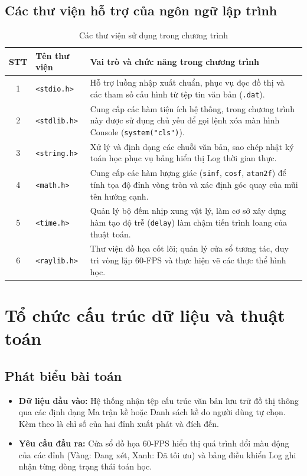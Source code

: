 \documentclass[12pt,a4paper,oneside]{report}
\begin{document}
\section{Các thư viện hỗ trợ của ngôn ngữ lập trình}
\begin{table}[H]
\centering
\caption{Các thư viện sử dụng trong chương trình}
\vspace{0.5em}
\begin{tabular}{|c|l|p{9cm}|}
\hline
\textbf{STT} & \textbf{Tên thư viện} & \textbf{Vai trò và chức năng trong chương trình} \\ \hline
1 & \texttt{<stdio.h>} & Hỗ trợ luồng nhập xuất chuẩn, phục vụ đọc đồ thị và các tham số cấu hình từ tệp tin văn bản (\texttt{.dat}). \\ \hline
2 & \texttt{<stdlib.h>} & Cung cấp các hàm tiện ích hệ thống, trong chương trình này được sử dụng chủ yếu để gọi lệnh xóa màn hình Console (\texttt{system("cls")}). \\ \hline
3 & \texttt{<string.h>} & Xử lý và định dạng các chuỗi văn bản, sao chép nhật ký toán học phục vụ bảng hiển thị Log thời gian thực. \\ \hline
4 & \texttt{<math.h>} & Cung cấp các hàm lượng giác (\texttt{sinf}, \texttt{cosf}, \texttt{atan2f}) để tính tọa độ đỉnh vòng tròn và xác định góc quay của mũi tên hướng cạnh. \\ \hline
5 & \texttt{<time.h>} & Quản lý bộ đếm nhịp xung vật lý, làm cơ sở xây dựng hàm tạo độ trễ (\texttt{delay}) làm chậm tiến trình loang của thuật toán. \\ \hline
6 & \texttt{<raylib.h>} & Thư viện đồ họa cốt lõi; quản lý cửa sổ tương tác, duy trì vòng lặp 60-FPS và thực hiện vẽ các thực thể hình học. \\ \hline
\end{tabular}
\end{table}

\chapter{Tổ chức cấu trúc dữ liệu và thuật toán}

\section{Phát biểu bài toán}
\begin{itemize}
    \item \textbf{Dữ liệu đầu vào:} Hệ thống nhận tệp cấu trúc văn bản lưu trữ đồ thị thông qua các định dạng Ma trận kề hoặc Danh sách kề do người dùng tự chọn. Kèm theo là chỉ số của hai đỉnh xuất phát và đích đến.
    \item \textbf{Yêu cầu đầu ra:} Cửa sổ đồ họa 60-FPS hiển thị quá trình đổi màu động của các đỉnh (Vàng: Đang xét, Xanh: Đã tối ưu) và bảng điều khiển Log ghi nhận từng dòng trạng thái toán học.
\end{itemize}
\end{document}
